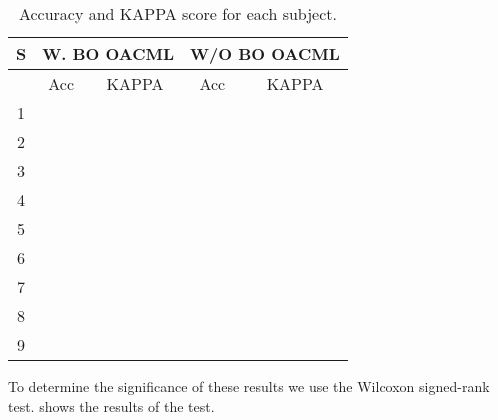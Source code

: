 \begin{table}[H]
	\centering
	\caption{Accuracy and KAPPA score for each subject.}
	\label{fig:results}
	\begin{tabular}{@{}ccc|cc@{}}
		\toprule
		\textbf{S}             & \multicolumn{2}{c|}{\textbf{W. BO OACML}} & \multicolumn{2}{c}{\textbf{W/O BO OACML}} \\ \midrule
		\multicolumn{1}{c|}{}  & Acc                   & KAPPA             & Acc                   & KAPPA             \\ \midrule
		\multicolumn{1}{c|}{1} &                       &                   &                       &                   \\
		\multicolumn{1}{c|}{2} &                       &                   &                       &                   \\
		\multicolumn{1}{c|}{3} &                       &                   &                       &                   \\
		\multicolumn{1}{c|}{4} &                       &                   &                       &                   \\
		\multicolumn{1}{c|}{5} & \textbf{}             &                   & \textbf{}             &                   \\
		\multicolumn{1}{c|}{6} &                       &                   &                       &                   \\
		\multicolumn{1}{c|}{7} &                       &                   &                       &                   \\
		\multicolumn{1}{c|}{8} &                       &                   &                       &                   \\
		\multicolumn{1}{c|}{9} &                       &                   &                       &                   \\ \bottomrule
	\end{tabular}
\end{table}

To determine the significance of these results we use the Wilcoxon signed-rank test.  shows the results of the test.

